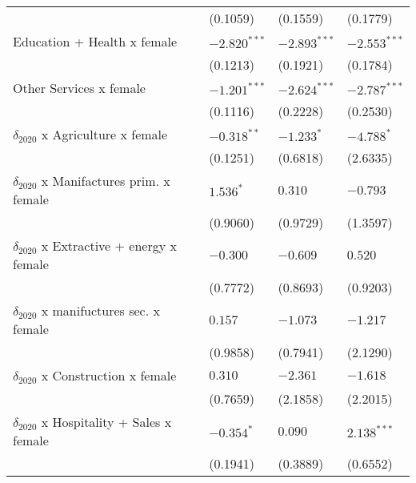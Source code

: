\begin{tabular}{llll}
                                                   &           (0.1059) &           (0.1559) &           (0.1779) \\
Education + Health x female                        &     $-2.820^{***}$ &     $-2.893^{***}$ &     $-2.553^{***}$ \\
                                                   &           (0.1213) &           (0.1921) &           (0.1784) \\
Other Services x female                            &     $-1.201^{***}$ &     $-2.624^{***}$ &     $-2.787^{***}$ \\
                                                   &           (0.1116) &           (0.2228) &           (0.2530) \\
$\delta_{2020}$ x Agriculture x female             &      $-0.318^{**}$ &         $-1.233^*$ &         $-4.788^*$ \\
                                                   &           (0.1251) &           (0.6818) &           (2.6335) \\
$\delta_{2020}$ x Manifactures prim. x female      &          $1.536^*$ &            $0.310$ &           $-0.793$ \\
                                                   &           (0.9060) &           (0.9729) &           (1.3597) \\
$\delta_{2020}$ x Extractive + energy x female     &           $-0.300$ &           $-0.609$ &            $0.520$ \\
                                                   &           (0.7772) &           (0.8693) &           (0.9203) \\
$\delta_{2020}$ x manifuctures sec. x female       &            $0.157$ &           $-1.073$ &           $-1.217$ \\
                                                   &           (0.9858) &           (0.7941) &           (2.1290) \\
$\delta_{2020}$ x Construction x female            &            $0.310$ &           $-2.361$ &           $-1.618$ \\
                                                   &           (0.7659) &           (2.1858) &           (2.2015) \\
$\delta_{2020}$ x Hospitality + Sales x female     &         $-0.354^*$ &            $0.090$ &      $2.138^{***}$ \\
                                                   &           (0.1941) &           (0.3889) &           (0.6552) \\

\end{tabular}

